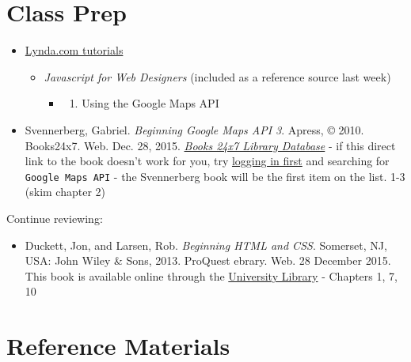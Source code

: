 \documentclass[]{book}
\providecommand{\tightlist}{%
  \setlength{\itemsep}{0pt}\setlength{\parskip}{0pt}}
\begin{document}
\section{Class Prep}\label{week03-prep}

\begin{itemize}
\item
  \href{http://www.lynda.com/SharedPlaylist/2b710369c9ec4d8c964467225c6610ad?org=unm.edu}{Lynda.com
  tutorials}

  \begin{itemize}
  \tightlist
  \item
    \emph{Javascript for Web Designers} (included as a reference source
    last week)

    \begin{itemize}
    \item
      \begin{enumerate}
      \def\labelenumi{\arabic{enumi}.}
      \setcounter{enumi}{4}
      \tightlist
      \item
        Using the Google Maps API
      \end{enumerate}
    \end{itemize}
  \end{itemize}
\item
  Svennerberg, Gabriel. \emph{Beginning Google Maps API 3}. Apress, ©
  2010. Books24x7. Web. Dec. 28, 2015.
  \href{http://library.books24x7.com.libproxy.unm.edu/toc.aspx?bookid=36390\&refid=SVA3S}{\emph{Books
  24x7 Library Database}} - if this direct link to the book doesn't work
  for you, try
  \href{http://library.unm.edu/applications/dam/plink.php?db_id=238}{logging
  in first} and searching for \texttt{Google\ Maps\ API} - the
  Svennerberg book will be the first item on the list. 1-3 (skim chapter
  2)
\end{itemize}

Continue reviewing:

\begin{itemize}
\tightlist
\item
  Duckett, Jon, and Larsen, Rob. \emph{Beginning HTML and CSS}.
  Somerset, NJ, USA: John Wiley \& Sons, 2013. ProQuest ebrary. Web. 28
  December 2015. This book is available online through the
  \href{http://site.ebrary.com.libproxy.unm.edu/lib/unma/detail.action?docID=10667426}{University
  Library} - Chapters 1, 7, 10
\end{itemize}

\section{Reference Materials}\label{week03-reference}
\end{document}
